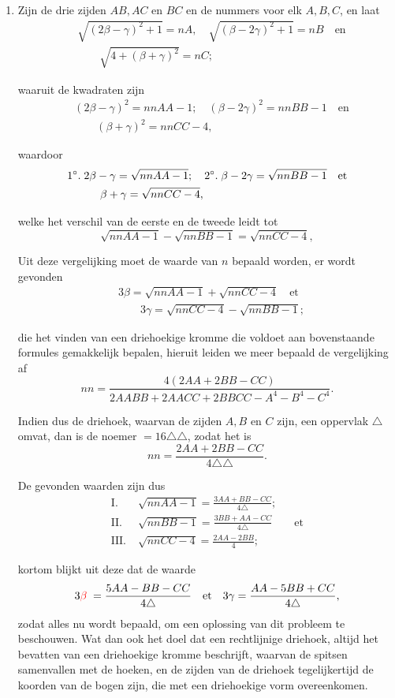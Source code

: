 \documentclass[10pt,a4paper]{article}
\newcommand{\switchenum}{\setcounter{enumi}{\arabic{enumi}-1}\switchcolumn}
\begin{document}
\begin{paracol}{2}
\begin{enumerate}[topsep=1px]
		\switchenum
		\item Zijn de drie zijden $AB, AC$ en $BC$ en de nummers voor elk $A, B, C$, en laat
		\begin{align*}
			&\sqrt{(2\beta - \gamma)^2+1} = nA, \quad \sqrt{(\beta-2\gamma)^2+1} = nB \quad \text{en}\\
			&\qquad \sqrt{4+(\beta + \gamma)^2}= nC;
		\end{align*}
		\par waaruit de kwadraten zijn
		\begin{align*}
			&(2\beta- \gamma)^2 = nnAA - 1; \quad (\beta-2\gamma )^2= nnBB-1\quad \text{en}\\
			&\qquad (\beta+\gamma)^2= nnCC-4,
		\end{align*}
		\par waardoor
		\begin{align*}
			&\text{1}\degree.\; 2\beta - \gamma = \sqrt{nnAA-1}; \quad \text{2}\degree.\; \beta - 2\gamma = \sqrt{nnBB-1}\quad \text{et}\\
			&\qquad \quad \beta + \gamma = \sqrt{nnCC-4},
		\end{align*}
		\par welke het verschil van de eerste en de tweede leidt tot
		\[
			\sqrt{nnAA-1}-\sqrt{nnBB-1} = \sqrt{nnCC-4},
		\]
		\par Uit deze vergelijking moet de waarde van $n$ bepaald worden, er wordt gevonden
		\begin{align*}
			&3\beta = \sqrt{nnAA-1}+\sqrt{nnCC-4} \quad \text{et}\\
			&\qquad 3\gamma = \sqrt{nnCC-4}-\sqrt{nnBB-1};
		\end{align*}
		\par die het vinden van een driehoekige kromme die voldoet aan bovenstaande formules gemakkelijk bepalen, hieruit leiden we meer bepaald de vergelijking af
		\[
			nn = \frac{4(2AA+2BB-CC)}{2AABB+2AACC+2BBCC-A^4-B^4-C^4}.
		\]
		\par Indien dus de driehoek, waarvan de zijden $A, B$ en $C$ zijn, een oppervlak $\triangle$ omvat, dan is de noemer $=16\triangle \triangle$, zodat het is 
		\[
			nn=\frac{2AA+2BB-CC}{4 \triangle \triangle}.
		\]
		\par De gevonden waarden zijn dus
		\begin{align*}
			\text{I}. \;& \sqrt{nnAA-1} = \frac{3AA+BB-CC}{4\triangle};\\
			\text{II}. \; & \sqrt{nnBB-1} = \frac{3BB+AA-CC}{4\triangle} \qquad \text{et}\\
			\text{III}. \;& \sqrt{nnCC-4} = \frac{2AA-2BB}{4};
		\end{align*}
		\par kortom blijkt uit deze dat de waarde
		\[
			3{\color{red}\beta}\; = \frac{5AA-BB-CC}{4\triangle} \quad \text{et} \quad 3\gamma = \frac{AA-5BB+CC}{4\triangle},
		\]
		zodat alles nu wordt bepaald, om een oplossing van dit probleem te beschouwen. Wat dan ook het doel dat een rechtlijnige driehoek, altijd het bevatten van een driehoekige kromme beschrijft, waarvan de spitsen samenvallen met de hoeken, en de zijden van de driehoek tegelijkertijd de koorden van de bogen zijn, die met een driehoekige vorm overeenkomen.
		

\end{enumerate}
\end{paracol}
\end{document}
